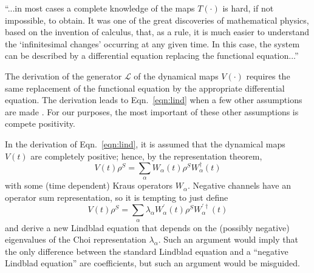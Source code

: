 ``...in most cases a complete knowledge of the maps $T(\cdot)$ is hard, if not impossible, to obtain.  It was one of the great discoveries of mathematical physics, based on the invention of calculus, that, as a rule, it is much easier to understand the `infinitesimal changes' occurring at any given time.  In this case, the system can be described by a differential equation replacing the functional equation...''

The derivation of the generator $\mathcal{L}$ of the dynamical maps $V(\cdot)$ requires the same replacement of the functional equation by the appropriate differential equation.  The derivation leads to Eqn.\ \ref{eqn:lind} when a few other assumptions are made \cite{Breuer2007}.  For our purposes, the most important of these other assumptions is compete positivity.

In the derivation of Eqn.\ \ref{eqn:lind}, it is assumed that the dynamical maps $V(t)$ are completely positive; hence, by the representation theorem,
$$
V(t)\rho^S = \sum_{\alpha} W_{\alpha}(t)\rho^S W_{\alpha}^\dagger(t)
$$
with some (time dependent) Kraus operators $W_\alpha$.  Negative channels have an operator sum representation, so it is tempting to just define
$$
V(t)\rho^S = \sum_\alpha \lambda_\alpha W_\alpha^\prime(t) \rho^S W_\alpha^{\prime\dagger}(t)
$$
and derive a new Lindblad equation that depends on the (possibly negative) eigenvalues of the Choi representation $\lambda_\alpha$.  Such an argument would imply that the only difference between the standard Lindblad equation and a ``negative Lindblad equation'' are coefficients, but such an argument would be misguided.

